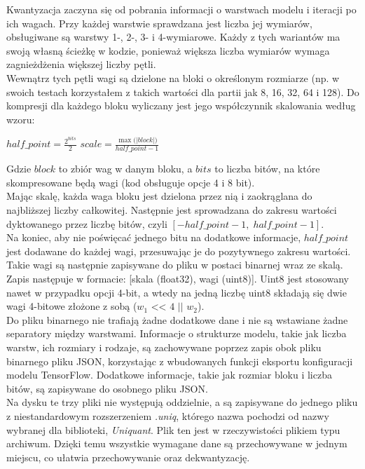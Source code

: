 Kwantyzacja zaczyna się od pobrania informacji o warstwach modelu i iteracji po ich wagach. Przy każdej warstwie sprawdzana jest liczba jej wymiarów, obsługiwane są warstwy 1-, 2-, 3- i 4-wymiarowe. Każdy z tych wariantów ma swoją własną ścieżkę w kodzie, ponieważ większa liczba wymiarów wymaga zagnieżdżenia większej liczby pętli. \\
Wewnątrz tych pętli wagi są dzielone na bloki o określonym rozmiarze (np. w swoich testach korzystałem z takich wartości dla partii jak 8, 16, 32, 64 i 128). Do kompresji dla każdego bloku wyliczany jest jego współczynnik skalowania według wzoru: \\
\vspace{-1.5em}
\begin{center}
$\mathit{half\_point} = \frac{2^{\mathit{bits}}}{2}$ \qquad $\mathit{scale} = \frac{\max\!\big(|\mathit{block}|\big)}{\mathit{half\_point} - 1}$ \\
\end{center}
Gdzie $\mathit{block}$ to zbiór wag w danym bloku, a $\mathit{bits}$ to liczba bitów, na które skompresowane będą wagi (kod obsługuje opcje 4 i 8 bit). \\
Mając skalę, każda waga bloku jest dzielona przez nią i zaokrąglana do najbliższej liczby całkowitej. Następnie jest sprowadzana do zakresu wartości dyktowanego przez liczbę bitów, czyli $[-\mathit{half\_point} - 1, \; \mathit{half\_point} - 1]$. \\
Na koniec, aby nie poświęcać jednego bitu na dodatkowe informacje, $\mathit{half\_point}$ jest dodawane do każdej wagi, przesuwając je do pozytywnego zakresu wartości. \\
Takie wagi są następnie zapisywane do pliku w postaci binarnej wraz ze skalą. Zapis następuje w formacie: [skala (float32), wagi (uint8)]. Uint8 jest stosowany nawet w przypadku opcji 4-bit, a wtedy na jedną liczbę uint8 składają się dwie wagi 4-bitowe złożone z sobą ($\mathit{w_1}\text{ << 4 || }\mathit{w_2}$). \\
Do pliku binarnego nie trafiają żadne dodatkowe dane i nie są wstawiane żadne separatory między warstwami. Informacje o strukturze modelu, takie jak liczba warstw, ich rozmiary i rodzaje, są zachowywane poprzez zapis obok pliku binarnego pliku JSON, korzystając z wbudowanych funkcji eksportu konfiguracji modelu TensorFlow. Dodatkowe informacje, takie jak rozmiar bloku i liczba bitów, są zapisywane do osobnego pliku JSON. \\
Na dysku te trzy pliki nie występują oddzielnie, a są zapisywane do jednego pliku z niestandardowym rozszerzeniem \textit{.uniq}, którego nazwa pochodzi od nazwy wybranej dla biblioteki, \textit{Uniquant}. Plik ten jest w rzeczywistości plikiem typu archiwum. Dzięki temu wszystkie wymagane dane są przechowywane w jednym miejscu, co ułatwia przechowywanie oraz dekwantyzację.

